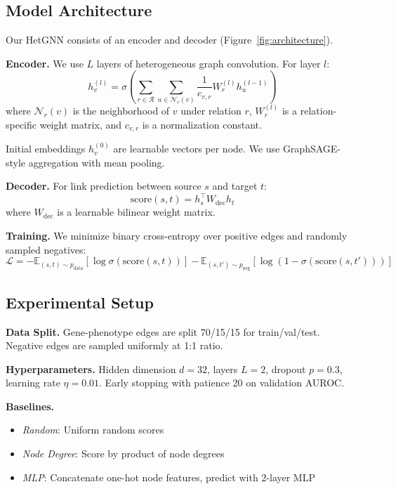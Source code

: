 \documentclass{article}
\begin{document}
\subsection{Model Architecture}

Our HetGNN consists of an encoder and decoder (Figure~\ref{fig:architecture}).

\textbf{Encoder.} We use $L$ layers of heterogeneous graph convolution. For layer $l$:
\begin{equation}
    h_v^{(l)} = \sigma\left( \sum_{r \in \mathcal{R}} \sum_{u \in \mathcal{N}_r(v)} \frac{1}{c_{v,r}} W_r^{(l)} h_u^{(l-1)} \right)
\end{equation}
where $\mathcal{N}_r(v)$ is the neighborhood of $v$ under relation $r$, $W_r^{(l)}$ is a relation-specific weight matrix, and $c_{v,r}$ is a normalization constant.

Initial embeddings $h_v^{(0)}$ are learnable vectors per node. We use GraphSAGE-style aggregation with mean pooling.

\textbf{Decoder.} For link prediction between source $s$ and target $t$:
\begin{equation}
    \text{score}(s, t) = h_s^\top W_{\text{dec}} h_t
\end{equation}
where $W_{\text{dec}}$ is a learnable bilinear weight matrix.

\textbf{Training.} We minimize binary cross-entropy over positive edges and randomly sampled negatives:
\begin{equation}
    \mathcal{L} = -\mathbb{E}_{(s,t) \sim p_{\text{data}}}[\log \sigma(\text{score}(s,t))] - \mathbb{E}_{(s,t') \sim p_{\text{neg}}}[\log(1 - \sigma(\text{score}(s,t')))]
\end{equation}

\subsection{Experimental Setup}

\textbf{Data Split.} Gene-phenotype edges are split 70/15/15 for train/val/test. Negative edges are sampled uniformly at 1:1 ratio.

\textbf{Hyperparameters.} Hidden dimension $d=32$, layers $L=2$, dropout $p=0.3$, learning rate $\eta=0.01$. Early stopping with patience 20 on validation AUROC.

\textbf{Baselines.}
\begin{itemize}
    \item \textit{Random}: Uniform random scores
    \item \textit{Node Degree}: Score by product of node degrees
    \item \textit{MLP}: Concatenate one-hot node features, predict with 2-layer MLP
\end{itemize}
\end{document}
